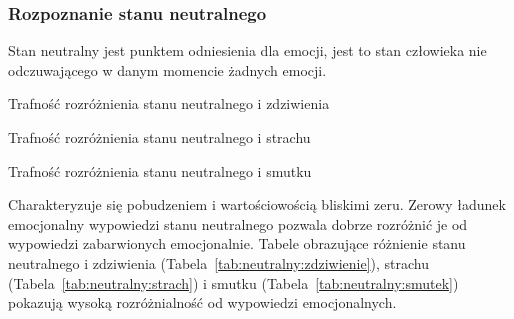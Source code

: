 \documentclass[a4paper,12pt,twoside,openany]{report}
\newcommand{\Tab}[1]{(Tabela~\ref{#1})}
\begin{document}
\subsubsection{Rozpoznanie stanu neutralnego}
Stan neutralny jest punktem odniesienia dla emocji, jest to stan człowieka nie odczuwającego w danym momencie żadnych emocji.
\begin{table}[hc!]
	\caption{Trafność rozróżnienia stanu neutralnego i zdziwienia}
	\centering
	
	\label{tab:neutralny:zdziwienie}
\end{table}
\begin{table}[hc!]
	\caption{Trafność rozróżnienia stanu neutralnego i strachu}
	\centering
	
	\label{tab:neutralny:strach}
\end{table}

\begin{table}[hc!]
	\caption{Trafność rozróżnienia stanu neutralnego i smutku}
	\centering
	
	\label{tab:neutralny:smutek}
\end{table}
Charakteryzuje się pobudzeniem i wartościowością bliskimi zeru.
Zerowy ładunek emocjonalny wypowiedzi stanu neutralnego pozwala dobrze rozróżnić je od wypowiedzi zabarwionych emocjonalnie. 
Tabele obrazujące różnienie stanu neutralnego i zdziwienia \Tab{tab:neutralny:zdziwienie}, strachu \Tab{tab:neutralny:strach} i smutku \Tab{tab:neutralny:smutek}
pokazują wysoką rozróżnialność od wypowiedzi emocjonalnych. 
%	
%	
\end{document}
